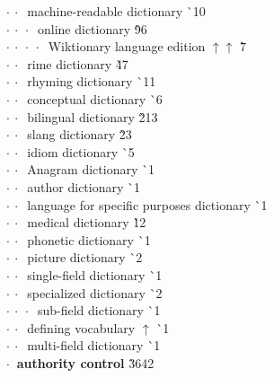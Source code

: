 \begin{tabbing}
$\cdot\:\cdot\:$  machine-readable dictionary  \` {\raisebox{.4\height}{\scalebox{.6}{+}}}10\\
$\cdot\:\cdot\:\cdot\:$  online dictionary  \` 9{\raisebox{.4\height}{\scalebox{.6}{+}}}6\\
$\cdot\:\cdot\:\cdot\:\cdot\:$  Wiktionary language edition $\uparrow\uparrow$ \` 7\\
$\cdot\:\cdot\:$  rime dictionary  \` 4{\raisebox{.4\height}{\scalebox{.6}{+}}}7\\
$\cdot\:\cdot\:$  rhyming dictionary  \` {\raisebox{.4\height}{\scalebox{.6}{+}}}11\\
$\cdot\:\cdot\:$  conceptual dictionary  \` {\raisebox{.4\height}{\scalebox{.6}{+}}}6\\
$\cdot\:\cdot\:$  bilingual dictionary  \` 2{\raisebox{.4\height}{\scalebox{.6}{+}}}13\\
$\cdot\:\cdot\:$  slang dictionary  \` 2{\raisebox{.4\height}{\scalebox{.6}{+}}}3\\
$\cdot\:\cdot\:$  idiom dictionary  \` {\raisebox{.4\height}{\scalebox{.6}{+}}}5\\
$\cdot\:\cdot\:$  Anagram dictionary  \` {\raisebox{.4\height}{\scalebox{.6}{+}}}1\\
$\cdot\:\cdot\:$  author dictionary  \` {\raisebox{.4\height}{\scalebox{.6}{+}}}1\\
$\cdot\:\cdot\:$  language for specific purposes dictionary  \` {\raisebox{.4\height}{\scalebox{.6}{+}}}1\\
$\cdot\:\cdot\:$  medical dictionary  \` 1{\raisebox{.4\height}{\scalebox{.6}{+}}}2\\
$\cdot\:\cdot\:$  phonetic dictionary  \` {\raisebox{.4\height}{\scalebox{.6}{+}}}1\\
$\cdot\:\cdot\:$  picture dictionary  \` {\raisebox{.4\height}{\scalebox{.6}{+}}}2\\
$\cdot\:\cdot\:$  single-field dictionary  \` {\raisebox{.4\height}{\scalebox{.6}{+}}}1\\
$\cdot\:\cdot\:$  specialized dictionary  \` {\raisebox{.4\height}{\scalebox{.6}{+}}}2\\
$\cdot\:\cdot\:\cdot\:$  sub-field dictionary  \` {\raisebox{.4\height}{\scalebox{.6}{+}}}1\\
$\cdot\:\cdot\:$  defining vocabulary $\uparrow$ \` {\raisebox{.4\height}{\scalebox{.6}{+}}}1\\
$\cdot\:\cdot\:$  multi-field dictionary  \` {\raisebox{.4\height}{\scalebox{.6}{+}}}1\\
$\cdot\:$  \textbf{authority control}  \` 36{\raisebox{.4\height}{\scalebox{.6}{+}}}42\\

\end{tabbing}
